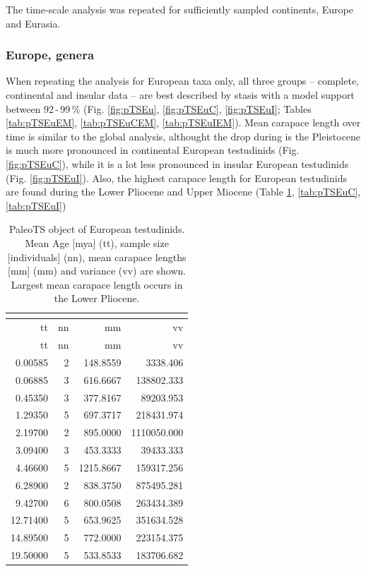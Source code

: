 The time-scale analysis was repeated for sufficiently sampled continents, Europe and Eurasia.

\subsubsection*{Europe, genera}\label{europe-genera}

When repeating the analysis for European taxa only, all three groups -- complete, continental and insular data -- are best described by stasis with a model support between 92\,-\,99\,\% (Fig. \ref{fig:pTSEu}, \ref{fig:pTSEuC}, \ref{fig:pTSEuI}; Tables \ref{tab:pTSEuEM}, \ref{tab:pTSEuCEM}, \ref{tab:pTSEuIEM}). Mean carapace length over time is similar to the global analysis, althought the drop during is the Pleistocene is much more pronounced in continental European testudinids (Fig. \ref{fig:pTSEuC}), while it is a lot less pronounced in insular European testudinids (Fig. \ref{fig:pTSEuI}). Also, the highest carapace length for European testudinids are found during the Lower Pliocene and Upper Miocene (Table \ref{tab:pTSEu}, \ref{tab:pTSEuC}, \ref{tab:pTSEuI})

\begin{longtable}[]{@{}rrrr@{}}
	\caption[PaleoTS object of European \T]{PaleoTS object of European testudinids. Mean Age [mya] (tt), sample size [individuals] (nn), mean carapace lengths [mm] (mm) and variance (vv) are shown. Largest mean carapace length occurs in the Lower Pliocene.}
	\label{tab:pTSEu}\tabularnewline
	\toprule
	tt & nn & mm & vv\tabularnewline
	\midrule
	\endfirsthead
	\toprule
	tt & nn & mm & vv\tabularnewline
	\midrule
	\endhead
	0.00585 & 2 & 148.8559 & 3338.406\tabularnewline
	0.06885 & 3 & 616.6667 & 138802.333\tabularnewline
	0.45350 & 3 & 377.8167 & 89203.953\tabularnewline
	1.29350 & 5 & 697.3717 & 218431.974\tabularnewline
	2.19700 & 2 & 895.0000 & 1110050.000\tabularnewline
	3.09400 & 3 & 453.3333 & 39433.333\tabularnewline
	4.46600 & 5 & 1215.8667 & 159317.256\tabularnewline
	6.28900 & 2 & 838.3750 & 875495.281\tabularnewline
	9.42700 & 6 & 800.0508 & 263434.389\tabularnewline
	12.71400 & 5 & 653.9625 & 351634.528\tabularnewline
	14.89500 & 5 & 772.0000 & 223154.375\tabularnewline
	19.50000 & 5 & 533.8533 & 183706.682\tabularnewline
	\bottomrule
\end{longtable}


